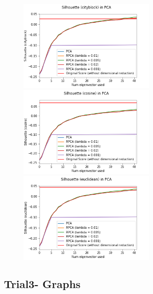 \documentclass[11pt]{scrartcl} %
\theoremstyle{plain}
\begin{document}
\begin{figure}[H]
\centering
\includegraphics[width=0.6\textwidth]{figures/rpcatrial2cityblock.png}\\
\includegraphics[width=0.6\textwidth]{figures/rpcatrial2cosine.png}\\
\includegraphics[width=0.6\textwidth]{figures/rpcatrial2euclidean.png}\\
\end{figure}

\subsection{Trial3- Graphs}
\end{document}
